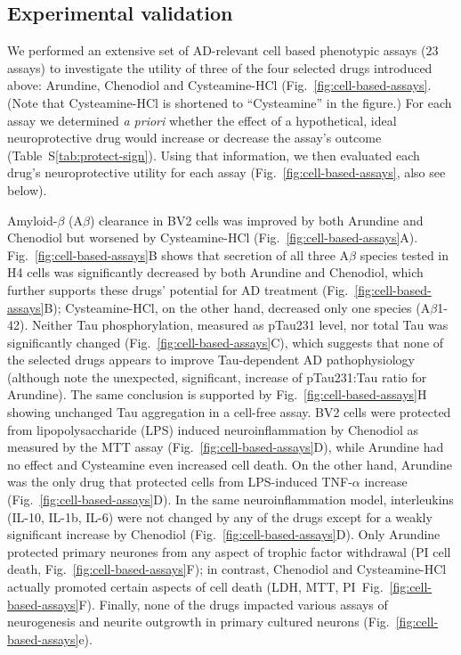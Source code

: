 \documentclass[letterpaper]{article}
\begin{document}
\subsection{Experimental validation}

We performed an extensive set of AD-relevant cell based phenotypic assays
($23$ assays) to investigate the utility of three of the four selected drugs
introduced above: Arundine, Chenodiol and Cysteamine-HCl
(Fig.~\ref{fig:cell-based-assays}.  (Note that Cysteamine-HCl is shortened to
``Cysteamine'' in the figure.)  For each assay we determined \emph{a priori}
whether the effect of a hypothetical, ideal neuroprotective drug would
increase or decrease the assay's outcome (Table~S\ref{tab:protect-sign}).
Using that information, we then evaluated each drug's neuroprotective utility
for each assay (Fig.~\ref{fig:cell-based-assays}, also see below).

Amyloid-$\beta$
(A$\beta$) clearance in BV2 cells was improved by both Arundine and Chenodiol
but worsened by Cysteamine-HCl (Fig.~\ref{fig:cell-based-assays}A).
Fig.~\ref{fig:cell-based-assays}B shows that secretion of all three A$\beta$
species tested in H4 cells was significantly decreased by both Arundine and
Chenodiol, which further supports these drugs' potential for AD treatment
(Fig.~\ref{fig:cell-based-assays}B); Cysteamine-HCl, on the other hand,
decreased only one species (A$\beta$1-42).  Neither Tau phosphorylation,
measured as pTau231 level, nor total Tau was significantly changed
(Fig.~\ref{fig:cell-based-assays}C), which suggests that none of the selected
drugs appears to improve Tau-dependent AD pathophysiology (although note the
unexpected, significant, increase of pTau231:Tau ratio for Arundine).  The
same conclusion is supported by Fig.~\ref{fig:cell-based-assays}H showing
unchanged Tau aggregation in a cell-free assay. BV2 cells were protected from
lipopolysaccharide (LPS) induced neuroinflammation by Chenodiol as measured by
the MTT assay (Fig.~\ref{fig:cell-based-assays}D), while Arundine had no
effect and Cysteamine even increased cell death.  On the other hand, Arundine
was the only drug that protected cells from LPS-induced TNF-$\alpha$ increase
(Fig.~\ref{fig:cell-based-assays}D).  In the same neuroinflammation model,
interleukins (IL-10, IL-1b, IL-6) were not changed by any of the drugs except
for a weakly significant increase by Chenodiol
(Fig.~\ref{fig:cell-based-assays}D).  Only Arundine protected primary neurones
from any aspect of trophic factor withdrawal (PI cell death,
Fig.~\ref{fig:cell-based-assays}F); in contrast, Chenodiol and Cysteamine-HCl
actually promoted certain aspects of cell death (LDH, MTT,
PI~Fig.~\ref{fig:cell-based-assays}F).  Finally, none of the drugs impacted
various assays of neurogenesis and neurite outgrowth in primary cultured
neurons (Fig.~\ref{fig:cell-based-assays}e).
\end{document}
